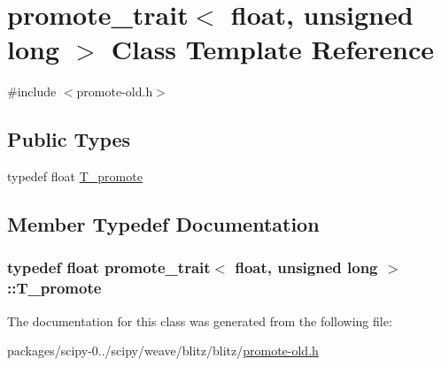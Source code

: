 \hypertarget{classpromote__trait_3_01float_00_01unsigned_01long_01_4}{}\section{promote\+\_\+trait$<$ float, unsigned long $>$ Class Template Reference}
\label{classpromote__trait_3_01float_00_01unsigned_01long_01_4}


{\ttfamily \#include $<$promote-\/old.\+h$>$}

\subsection*{Public Types}
\begin{DoxyCompactItemize}
\item 
typedef float \hyperlink{classpromote__trait_3_01float_00_01unsigned_01long_01_4_aa7527a734574baa385fd2578e0dac4c2}{T\+\_\+promote}
\end{DoxyCompactItemize}


\subsection{Member Typedef Documentation}
\hypertarget{classpromote__trait_3_01float_00_01unsigned_01long_01_4_aa7527a734574baa385fd2578e0dac4c2}{}
\subsubsection[{T\+\_\+promote}]{\setlength{\rightskip}{0pt plus 5cm}typedef float {\bf promote\+\_\+trait}$<$ float, unsigned long $>$\+::{\bf T\+\_\+promote}}\label{classpromote__trait_3_01float_00_01unsigned_01long_01_4_aa7527a734574baa385fd2578e0dac4c2}


The documentation for this class was generated from the following file\+:\begin{DoxyCompactItemize}
\item 
packages/scipy-\/0../scipy/weave/blitz/blitz/\hyperlink{promote-old_8h}{promote-\/old.\+h}\end{DoxyCompactItemize}
